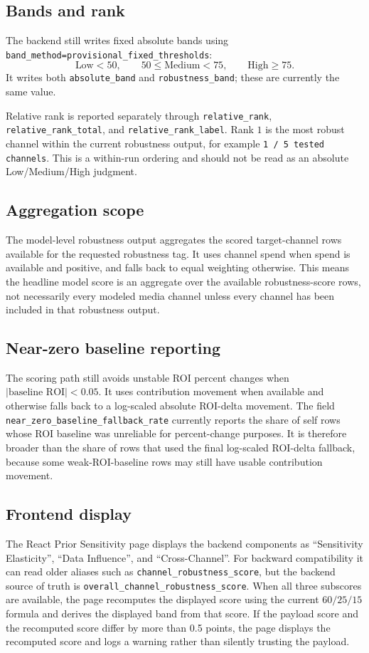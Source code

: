 \documentclass{article}
\begin{document}
\subsection{Bands and rank}

The backend still writes fixed absolute bands using
\texttt{band\_method=provisional\_fixed\_thresholds}:
\[
\text{Low}<50,\qquad 50\leq\text{Medium}<75,\qquad \text{High}\geq75.
\]
It writes both \texttt{absolute\_band} and \texttt{robustness\_band}; these are
currently the same value.

Relative rank is reported separately through \texttt{relative\_rank},
\texttt{relative\_rank\_total}, and \texttt{relative\_rank\_label}. Rank $1$ is
the most robust channel within the current robustness output, for example
\texttt{1 / 5 tested channels}. This is a within-run ordering and should not be
read as an absolute Low/Medium/High judgment.

\subsection{Aggregation scope}

The model-level robustness output aggregates the scored target-channel rows
available for the requested robustness tag. It uses channel spend when spend is
available and positive, and falls back to equal weighting otherwise. This means
the headline model score is an aggregate over the available robustness-score rows,
not necessarily every modeled media channel unless every channel has been included
in that robustness output.

\subsection{Near-zero baseline reporting}

The scoring path still avoids unstable ROI percent changes when
$|\text{baseline ROI}|<0.05$. It uses contribution movement when available and
otherwise falls back to a log-scaled absolute ROI-delta movement. The field
\texttt{near\_zero\_baseline\_fallback\_rate} currently reports the share of
self rows whose ROI baseline was unreliable for percent-change purposes. It is
therefore broader than the share of rows that used the final log-scaled ROI-delta
fallback, because some weak-ROI-baseline rows may still have usable contribution
movement.

\subsection{Frontend display}

The React Prior Sensitivity page displays the backend components as
``Sensitivity Elasticity'', ``Data Influence'', and ``Cross-Channel''. For
backward compatibility it can read older aliases such as
\texttt{channel\_robustness\_score}, but the backend source of truth is
\texttt{overall\_channel\_robustness\_score}. When all three subscores are
available, the page recomputes the displayed score using the current $60/25/15$
formula and derives the displayed band from that score. If the payload score and
the recomputed score differ by more than 0.5 points, the page displays the
recomputed score and logs a warning rather than silently trusting the payload.
\end{document}

